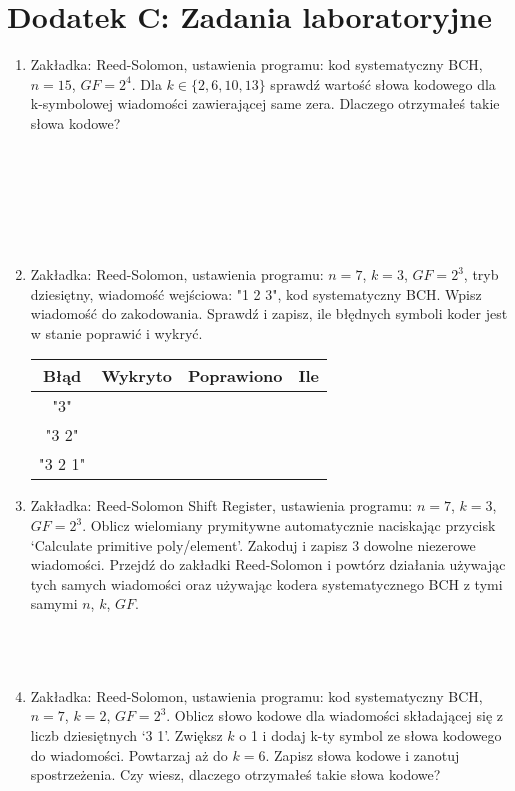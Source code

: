 \setcounter{secnumdepth}{0}
\section*{Dodatek C: Zadania laboratoryjne}

\begin{enumerate}
    \item Zakładka: Reed-Solomon, ustawienia programu: kod systematyczny BCH, $n=15$, $GF=2^4$.
    Dla $k \in \{ 2, 6, 10, 13 \}$ sprawdź wartość słowa kodowego dla k-symbolowej wiadomości zawierającej same zera. Dlaczego otrzymałeś takie słowa kodowe?\\ \\ \\ \\ \\ \\ \\
    
    \item Zakładka: Reed-Solomon, ustawienia programu: $n = 7$, $k = 3$, $GF = 2^3$, tryb dziesiętny, wiadomość wejściowa: "1 2 3",
    kod systematyczny BCH. Wpisz wiadomość do zakodowania. Sprawdź i zapisz, ile błędnych symboli koder jest w stanie poprawić i wykryć.
    \begin{table}[h]
    \renewcommand{\arraystretch}{1.8}
    \centering
    \begin{tabular}{|c|c|c|>{\centering\arraybackslash}p{5cm}|}
        \hline
        \textbf{Błąd} & \textbf{Wykryto} & \textbf{Poprawiono} & \textbf{Ile} \\
        \hline
        "3" & & & \\
        \hline
        "3 2" & & & \\
        \hline
        "3 2 1" & & & \\
        \hline
    \end{tabular}
    \label{tab:rs2}
\end{table}
    \item Zakładka: Reed-Solomon Shift Register, ustawienia programu: $n = 7$, $k = 3$, $GF = 2^3$. Oblicz wielomiany prymitywne automatycznie naciskając przycisk `Calculate primitive poly/element'.
    Zakoduj i zapisz 3 dowolne niezerowe wiadomości.
    Przejdź do zakładki Reed-Solomon i powtórz działania używając tych samych wiadomości oraz używając kodera systematycznego BCH z tymi samymi $n$, $k$, $GF$.\\ \\ \\ \\
    \item Zakładka: Reed-Solomon, ustawienia programu: kod systematyczny BCH, $n=7$, $k=2$, $GF=2^3$.
    Oblicz słowo kodowe dla wiadomości składającej się z liczb dziesiętnych `3 1'.
    Zwiększ $k$ o 1 i dodaj k-ty symbol ze słowa kodowego do wiadomości. Powtarzaj aż do $k=6$.
    Zapisz słowa kodowe i zanotuj spostrzeżenia.
    Czy wiesz, dlaczego otrzymałeś takie słowa kodowe?
    

\end{enumerate}
